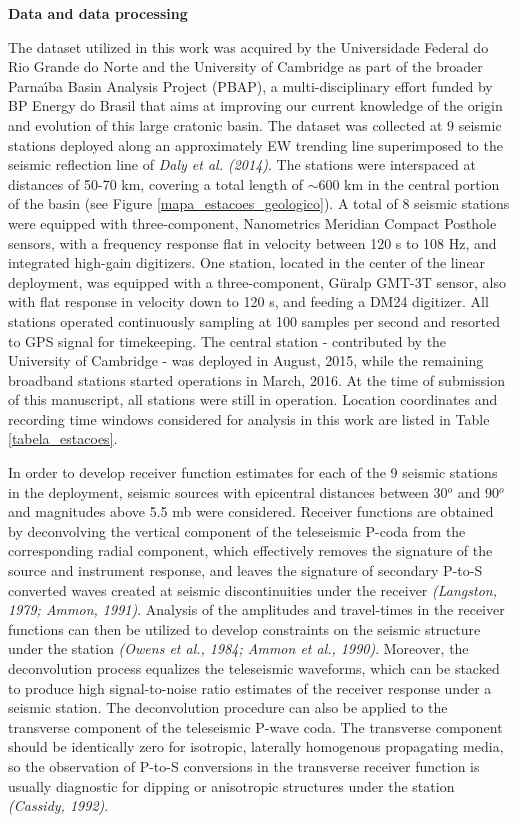 \documentclass[manuscript,11pt]{geophysics}
\begin{document}
\begin{flushleft}
\textbf{\LARGE Data and data processing}
\end{flushleft}

The dataset utilized in this work was acquired by the Universidade Federal do Rio Grande do Norte and the University of Cambridge as part of the broader Parna\'{\i}ba Basin Analysis Project (PBAP), a multi-disciplinary effort funded by BP Energy do Brasil that aims at improving our current knowledge of the origin and evolution of this large cratonic basin. The dataset was collected at 9 seismic stations deployed along an approximately EW trending line superimposed to the seismic reflection line of \textit{Daly et al. (2014)}. The stations were interspaced at distances of 50-70 km, covering a total length of $\sim$600 km in the central portion of the basin (see Figure \ref{mapa_estacoes_geologico}). A total of 8 seismic stations were equipped with three-component, Nanometrics Meridian Compact Posthole sensors, with a frequency response flat in velocity between 120 s to 108 Hz, and integrated high-gain digitizers. One station, located in the center of the linear deployment, was equipped with a three-component, G\"uralp GMT-3T sensor, also with flat response in velocity down to 120 s, and feeding a DM24 digitizer. All stations operated continuously sampling at 100 samples per second and resorted to GPS signal for timekeeping. The central station - contributed by the University of Cambridge - was deployed in August, 2015, while the remaining broadband stations started operations in March, 2016. At the time of submission of this manuscript, all stations were still in operation. Location coordinates and recording time windows considered for analysis in this work are listed in Table \ref{tabela_estacoes}. 

In order to develop receiver function estimates for each of the 9 seismic stations in the deployment, seismic sources with epicentral distances between 30$^o$ and 90$^o$ and magnitudes above 5.5 mb were considered. Receiver functions are obtained by deconvolving the vertical component of the teleseismic P-coda from the corresponding radial component, which effectively removes the signature of the source and instrument response, and leaves the signature of secondary P-to-S converted waves created at seismic discontinuities under the receiver \textit{(Langston, 1979; Ammon, 1991)}. Analysis of the amplitudes and travel-times in the receiver functions can then be utilized to develop constraints on the seismic structure under the station \textit{(Owens et al., 1984; Ammon et al., 1990)}. Moreover, the deconvolution process equalizes the teleseismic waveforms, which can be stacked to produce high signal-to-noise ratio estimates of the receiver response under a seismic station. The deconvolution procedure can also be applied to the transverse component of the teleseismic P-wave coda. The transverse component should be identically zero for isotropic, laterally homogenous propagating media, so the observation of P-to-S conversions in the transverse receiver function is usually diagnostic for dipping or anisotropic structures under the station \textit{(Cassidy, 1992)}.
\end{document}
